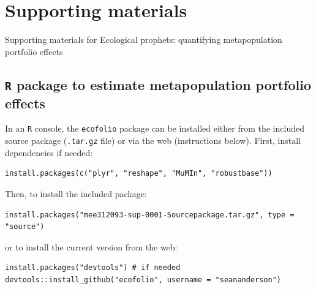 

\chapter{Supporting materials}{Supporting materials for Ecological prophets: quantifying metapopulation portfolio effects}

\section{\texttt{R} package to estimate metapopulation portfolio effects}

In an \texttt{R} console, the \texttt{ecofolio} package can be installed either
from the included source package (\texttt{.tar.gz} file)
or via the web (instructions below). First, install dependencies if needed:

\begin{verbatim}
install.packages(c("plyr", "reshape", "MuMIn", "robustbase"))
\end{verbatim}

\noindent
Then, to install the included package:


\begin{verbatim}
install.packages("mee312093-sup-0001-Sourcepackage.tar.gz", type = "source")
\end{verbatim}


\noindent
or to install the current version from the web:

\begin{verbatim}
install.packages("devtools") # if needed
devtools::install_github("ecofolio", username = "seananderson")
\end{verbatim}

